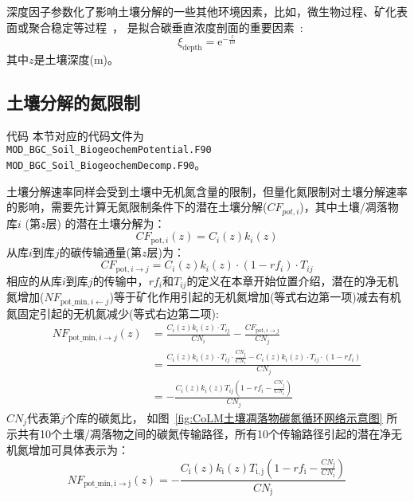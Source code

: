 深度因子参数化了影响土壤分解的一些其他环境因素，比如，微生物过程、矿化表面或聚合稳定等过程~\citep{koven2013effect}，
是拟合碳垂直浓度剖面的重要因素~\citep{jenkinson2008turnover}:
\begin{equation}
  \xi_{\mathrm{d e p t h}}={\mathrm e}^{-\frac{z}{10}}
\end{equation}
其中$z$是土壤深度(m)。


\subsection{土壤分解的氮限制}\label{土壤分解的氮限制}
\begin{mymdframed}{代码}
  本节对应的代码文件为\\ \texttt{MOD\_BGC\_Soil\_BiogeochemPotential.F90}\\
  \texttt{MOD\_BGC\_Soil\_BiogeochemDecomp.F90}。
\end{mymdframed}

土壤分解速率同样会受到土壤中无机氮含量的限制，但量化氮限制对土壤分解速率的影响，需要先计算无氮限制条件下的潜在土壤分解($CF_{pot,i}$)，其中土壤/凋落物库$i$ (第$z$层) 的潜在土壤分解为：
\begin{equation}
  C F_{\mathrm{pot},i}(z)=C_{i}(z) k_{i}(z)
\end{equation}
从库$i$到库$j$的碳传输通量(第$z$层)为：
\begin{equation}
  C F_{\mathrm{pot}, i \rightarrow j}=C_{i}(z) k_{i}(z) \cdot\left(1-r f_{i}\right) \cdot T_{i j}
\end{equation}
相应的从库$i$到库$j$的传输中，$r f_{i}$和$T_{i j}$的定义在本章开始位置介绍，潜在的净无机氮增加($NF_{\mathrm{pot\_min,}i\gets j}$)等于矿化作用引起的无机氮增加(等式右边第一项)减去有机氮固定引起的无机氮减少(等式右边第二项):
\begin{equation}
  \begin{aligned}
    NF_{\mathrm{pot\_min}, i \rightarrow j}\left(z\right)&=\frac{C_{i}(z) k_{i}(z) \cdot T_{ij}}{C N_{i}}-\frac{C F_{\mathrm{pot}, i \rightarrow j}}{C N_{j}} \\
    & =\frac{C_{i}(z) k_{i}(z) \cdot T_{i j} \cdot \frac{C N_{j}}{C N_{i}}-C_{i}(z) k_{i}(z) \cdot T_{i j} \cdot\left(1-r f_{i}\right)}{C N_{j}} \\
    &=-\frac{C_{i}(z) k_{i}(z) T_{i j}\left(1-r f_{i}-\frac{C N_{j}}{C N_{i}}\right)}{C N_{j}}
  \end{aligned}
\end{equation}
$C N_{j}$代表第$j$个库的碳氮比，
如图~\ref{fig:CoLM土壤凋落物碳氮循环网络示意图} 所示共有10个土壤/凋落物之间的碳氮传输路径，所有10个传输路径引起的潜在净无机氮增加可具体表示为：
\begin{equation}\label{NF_pot_minmet}
  NF_{\mathrm{{pot}\_{min,i \rightarrow {j}}}}(z)=-\frac{C_{\mathrm{{i}}}(z) k_{\mathrm{{i}}}(z) T_{\mathrm{i, j}}\left(1-r f_{\mathrm{i}}-\frac{C N_{\mathrm{{j }}}}{C N_{\mathrm{i}}}\right)}{C N_{\mathrm{{j }}}}
\end{equation}

